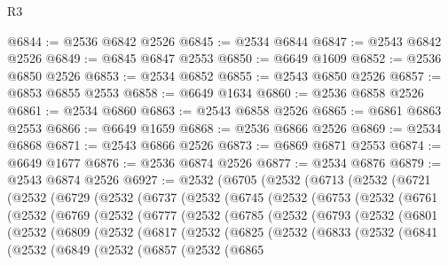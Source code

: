 \begin{lexlean}{R3}
\begin{coremodule}
@6844 := @2536 @6842 @2526
@6845 := @2534 @6844
@6847 := @2543 @6842 @2526
@6849 := @6845 @6847 @2553
@6850 := @6649 @1609
@6852 := @2536 @6850 @2526
@6853 := @2534 @6852
@6855 := @2543 @6850 @2526
@6857 := @6853 @6855 @2553
@6858 := @6649 @1634
@6860 := @2536 @6858 @2526
@6861 := @2534 @6860
@6863 := @2543 @6858 @2526
@6865 := @6861 @6863 @2553
@6866 := @6649 @1659
@6868 := @2536 @6866 @2526
@6869 := @2534 @6868
@6871 := @2543 @6866 @2526
@6873 := @6869 @6871 @2553
@6874 := @6649 @1677
@6876 := @2536 @6874 @2526
@6877 := @2534 @6876
@6879 := @2543 @6874 @2526
@6927 := @2532
    (@6705
      (@2532
        (@6713
          (@2532
            (@6721
              (@2532
                (@6729
                  (@2532
                    (@6737
                      (@2532
                        (@6745
                          (@2532
                            (@6753
                              (@2532
                                (@6761
                                  (@2532
                                    (@6769
                                      (@2532
                                        (@6777
                                          (@2532
                                            (@6785
                                              (@2532
                                                (@6793
                                                  (@2532
                                                    (@6801
                                                      (@2532
                                                        (@6809
                                                          (@2532
                                                            (@6817
                                                              (@2532
                                                                (@6825
                                                                  (@2532
                                                                    (@6833
                                                                      (@2532
                                                                        (@6841
                                                                          (@2532
                                                                            (@6849
                                                                              (@2532
                                                                                (@6857
                                                                                  (@2532
                                                                                    (@6865

\end{coremodule}
\end{lexlean}

